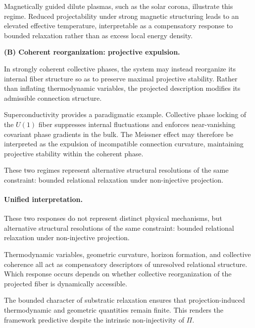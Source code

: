     Magnetically guided dilute plasmas,
    such as the solar corona,
    illustrate this regime.
    Reduced projectability under strong magnetic structuring
    leads to an elevated effective temperature,
    interpretable as a compensatory response to bounded relaxation
    rather than as excess local energy density.

    \medskip
    \textbf{(B) Coherent reorganization: projective expulsion.}

    In strongly coherent collective phases,
    the system may instead reorganize its internal fiber structure
    so as to preserve maximal projective stability.
    Rather than inflating thermodynamic variables,
    the projected description modifies its admissible connection structure.

    Superconductivity provides a paradigmatic example.
    Collective phase locking of the $U(1)$ fiber
    suppresses internal fluctuations and enforces
    near-vanishing covariant phase gradients in the bulk.
    The Meissner effect may therefore be interpreted
    as the expulsion of incompatible connection curvature,
    maintaining projective stability within the coherent phase.

    \medskip
    These two regimes represent alternative structural resolutions
    of the same constraint:
    bounded relational relaxation under non-injective projection.

  \paragraph{Unified interpretation.}

    These two responses do not represent distinct physical mechanisms,
    but alternative structural resolutions of the same constraint:
    bounded relational relaxation under non-injective projection.

    Thermodynamic variables, geometric curvature,
    horizon formation, and collective coherence
    all act as compensatory descriptors of unresolved relational structure.
    Which response occurs depends on whether
    collective reorganization of the projected fiber
    is dynamically accessible.

    The bounded character of substratic relaxation ensures that
    projection-induced thermodynamic and geometric quantities remain finite.
    This renders the framework predictive despite
    the intrinsic non-injectivity of $\Pi$.

